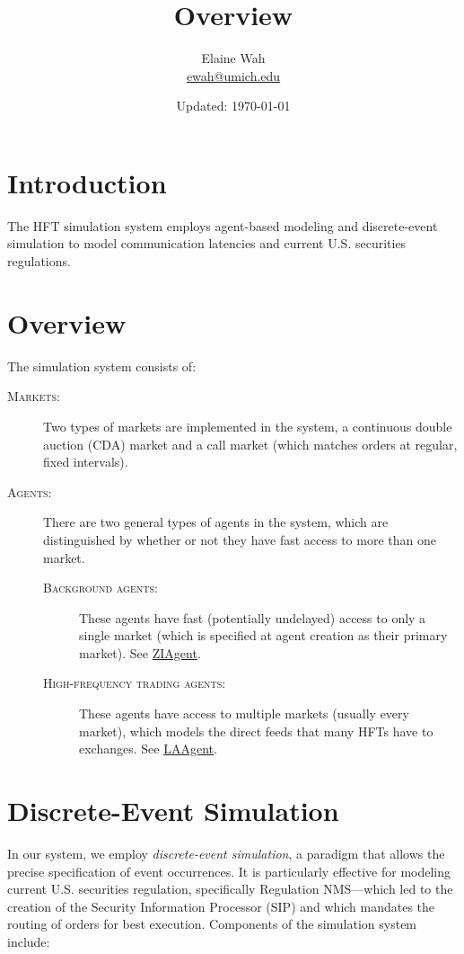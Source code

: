 \documentclass[11pt]{article}
\title{Overview}
\author{
  Elaine Wah \\
  \href{mailto:ewah@umich.edu}{ewah@umich.edu}
}
\date{Updated: \today}
\begin{document}
\maketitle

\section{Introduction}

The HFT simulation system employs agent-based modeling and discrete-event
simulation to model communication latencies and current U.S. securities
regulations.

\section{Overview}

The simulation system consists of:
\begin{description}
\item[\textsc{Markets}:] Two types of markets are implemented in the system, a
  continuous double auction (CDA) market and a call market (which matches orders at regular, fixed
  intervals).

\item[\textsc{Agents}:] There are two general types of agents in the system,
  which are distinguished by whether or not they have fast access to more than
  one market.

\begin{description}
\item[\textsc{Background agents}:] These agents have fast (potentially
  undelayed) access to only a single market (which is specified at agent
  creation as their primary market). See
  \href{../src/entity/agent/ZIAgent.java}{\textsf{ZIAgent}}.

\item[\textsc{High-frequency trading agents}:] These agents have access to
  multiple markets (usually every market), which models the
  direct feeds that many HFTs have to exchanges. See \href{../src/entity/agent/LAAgent.java}{\textsf{LAAgent}}.
\end{description}
\end{description}

\section{Discrete-Event Simulation}

In our system, we employ \emph{discrete-event simulation}, a paradigm that
allows the precise specification of event occurrences. It is particularly
effective for modeling current U.S. securities regulation, specifically
Regulation NMS---which led to the creation of the Security Information Processor
(SIP) and which mandates the routing of orders for best execution.  Components
of the simulation system include:
\end{document}
